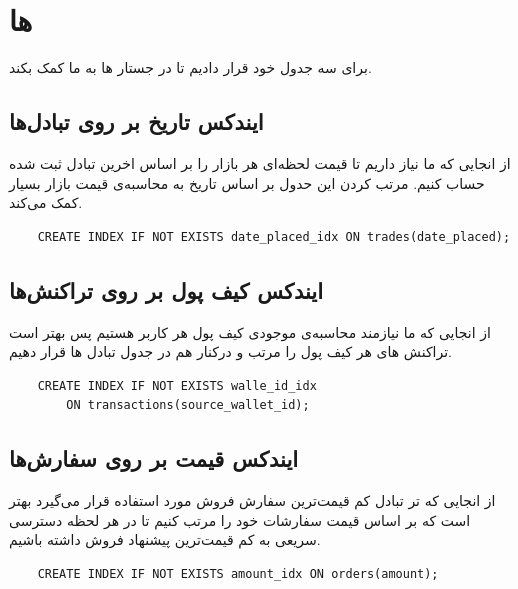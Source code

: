 \documentclass{book}
\begin{document}
\section{ها}
برای سه جدول خود  قرار دادیم تا در جستار ها به ما کمک بکند.
\subsection{ایندکس تاریخ بر روی تبادل‌ها}
از انجایی که ما نیاز داریم تا قیمت لحظه‌ای هر بازار را بر اساس اخرین تبادل ثبت شده حساب کنیم. مرتب کردن این حدول بر اساس تاریخ به محاسبه‌ی قیمت بازار بسیار کمک می‌کند.

\begin{latin}
    \begin{verbatim}
    CREATE INDEX IF NOT EXISTS date_placed_idx ON trades(date_placed);
    \end{verbatim}
\end{latin}


\subsection{ایندکس کیف پول بر روی تراکنش‌ها}
از انجایی که ما نیازمند محاسبه‌ی موجودی کیف پول هر کاربر هستیم پس بهتر است تراکنش های هر کیف پول را مرتب و درکنار هم در جدول تبادل ها قرار دهیم.

\begin{latin}
    \begin{verbatim}
    CREATE INDEX IF NOT EXISTS walle_id_idx 
        ON transactions(source_wallet_id);
    \end{verbatim}
\end{latin}

\subsection{ایندکس قیمت بر روی سفارش‌ها}
از انجایی که تر تبادل کم قیمت‌ترین سفارش فروش مورد استفاده قرار می‌گیرد بهتر است که بر اساس قیمت سفارشات خود را مرتب کنیم تا در هر لحظه دسترسی سریعی به کم قیمت‌ترین پیشنهاد فروش داشته باشیم.

\begin{latin}
    \begin{verbatim}
    CREATE INDEX IF NOT EXISTS amount_idx ON orders(amount);
    \end{verbatim}
\end{latin}
\end{document}
